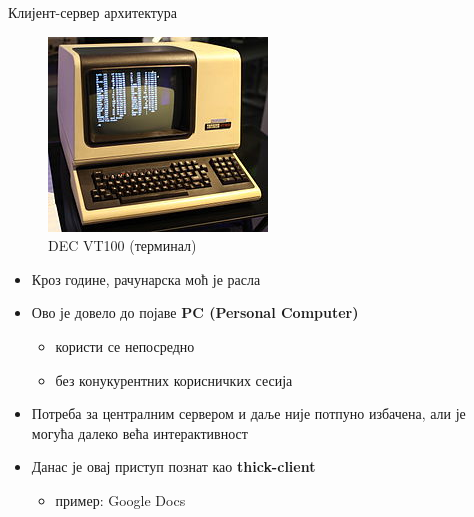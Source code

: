 \documentclass{beamer}
\begin{document}
\begin{frame}[allowframebreaks]{Клијент-сервер архитектура}
        \begin{figure}
            \centering
            \includegraphics[width=\textwidth,height=0.7\textheight,keepaspectratio]{images/DEC_VT100_terminal.jpg}
            \caption{DEC VT100 (терминал)}
            \label{fig:terminal}
        \end{figure}
        
        \framebreak
        
        \begin{itemize}
            \item Кроз године, рачунарска моћ је расла
            \item Ово је довело до појаве \textbf{PC (Personal Computer)}
            \begin{itemize}
                \item користи се непосредно
                \item без конукурентних корисничких сесија
            \end{itemize}
            \item Потреба за централним сервером и даље није потпуно избачена, али је могућа далеко већа интерактивност
            \item Данас је овај приступ познат као \textbf{thick-client}
            \begin{itemize}
                \item пример: Google Docs
            \end{itemize}
        \end{itemize}
    \end{frame}
    
\end{document}
